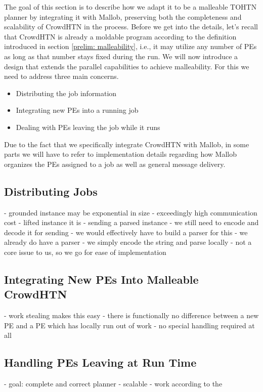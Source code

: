 The goal of this section is to describe how we adapt it to be a malleable TOHTN planner by integrating it with Mallob, preserving both the completeness and scalability of CrowdHTN in the process. Before we get into the details, let's recall that CrowdHTN is already a moldable program according to the definition introduced in section \ref{prelim: malleability}, i.e., it may utilize any number of PEs as long as that number stays fixed during the run. We will now introduce a design that extends the parallel capabilities to achieve malleability. For this we need to address three main concerns.
\begin{itemize}
	\item Distributing the job information
	\item Integrating new PEs into a running job
	\item Dealing with PEs leaving the job while it runs
\end{itemize}
Due to the fact that we specifically integrate CrowdHTN with Mallob, in some parts we will have to refer to implementation details regarding how Mallob organizes the PEs assigned to a job as well as general message delivery.

\subsection{Distributing Jobs}
- grounded instance may be exponential in size
- exceedingly high communication cost
- lifted instance it is
	- sending a parsed instance - we still need to encode and decode it for sending
	- we would effectively have to build a parser for this
	- we already do have a parser
	- we simply encode the string and parse locally
	- not a core issue to us, so we go for ease of implementation

\subsection{Integrating New PEs Into Malleable CrowdHTN}
- work stealing makes this easy
- there is functionally no difference between a new PE and a PE which has locally run out of work
- no special handling required at all

\subsection{Handling PEs Leaving at Run Time}
- goal: complete and correct planner
- scalable
- work according to the 

